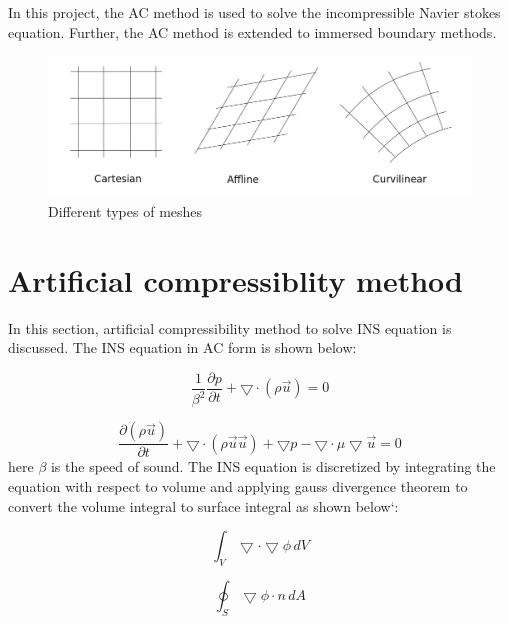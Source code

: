 \documentclass[12pt]{elsarticle}
\begin{document}
	In this project, the AC method is used to solve the incompressible Navier stokes equation. Further, the AC method is extended to immersed boundary methods.
	
	\begin{figure}[h]
		\centering\includegraphics[width=1\linewidth]{finite_difference_grids.png}
		\caption{Different types of meshes}
	\end{figure}
	
	\section{Artificial compressiblity method}
	\label{S:2}
	In this section, artificial compressibility method to solve INS equation is discussed. The INS equation in AC form is shown below:
	
	\begin{equation}
		\frac{1}{\beta^2}\frac{\partial p}{\partial t}+\bigtriangledown \cdot(\rho \overrightarrow{u})=0
	\end{equation}
	
	\begin{equation}
		\frac{\partial (\rho \overrightarrow{u})}{\partial t}+\bigtriangledown \cdot (\rho \overrightarrow{u} \overrightarrow{u})+\bigtriangledown p -\bigtriangledown \cdot \mu \bigtriangledown \overrightarrow{u} =0
	\end{equation}
	here $\beta$ is the speed of sound. The INS equation is discretized by integrating the equation with respect to volume and applying gauss divergence theorem to convert the volume integral to surface integral as shown below`:
	
	\begin{equation}
		\int_V \bigtriangledown \cdot  \bigtriangledown \phi \,dV 
	\end{equation}\newline
	
	\begin{equation}
		\oint_S \bigtriangledown \phi \cdot n \,dA 
	\end{equation}
	
\end{document}

